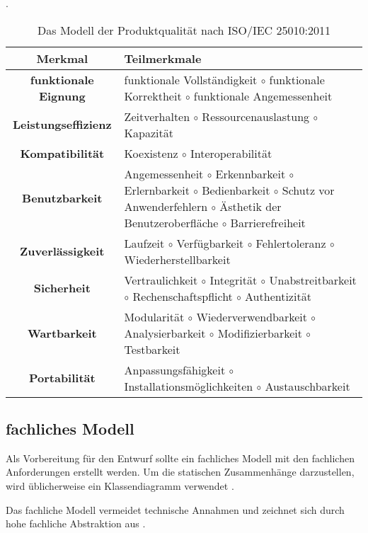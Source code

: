 \begin{table}[H]
    \centering
    \caption{Das Modell der Produktqualität nach ISO/IEC 25010:2011 \autocite[vgl.][S. 10]{ISO25010}}. 
    \label{table:SQuaRE}
    \begin{tabularx}{\columnwidth}{c|X}
    \textbf{Merkmal} & \textbf{Teilmerkmale} \\
    \hline
    \hline
    \textbf{funktionale Eignung} & 
        funktionale Vollständigkeit {$\circ$} funktionale Korrektheit {$\circ$} funktionale Angemessenheit 
    \\
    \hline
    \textbf{Leistungseffizienz}  & 
        Zeitverhalten {$\circ$} Ressourcenauslastung {$\circ$} Kapazität
    \\
    \hline
    \textbf{Kompatibilität}  & 
        Koexistenz {$\circ$} Interoperabilität
    \\
    \hline
    \textbf{Benutzbarkeit}  & 
        Angemessenheit {$\circ$} Erkennbarkeit {$\circ$} Erlernbarkeit {$\circ$} Bedienbarkeit {$\circ$} Schutz vor Anwenderfehlern {$\circ$} Ästhetik der Benutzeroberfläche {$\circ$} Barrierefreiheit
    \\
    \hline
    \textbf{Zuverlässigkeit}  & 
        Laufzeit {$\circ$} Verfügbarkeit {$\circ$} Fehlertoleranz {$\circ$} Wiederherstellbarkeit
    \\
    \hline
    \textbf{Sicherheit}  & 
        Vertraulichkeit {$\circ$} Integrität {$\circ$} Unabstreitbarkeit {$\circ$} Rechenschaftspflicht {$\circ$} Authentizität 
    \\
    \hline
    \textbf{Wartbarkeit}  & 
        Modularität {$\circ$} Wiederverwendbarkeit {$\circ$} Analysierbarkeit {$\circ$} Modifizierbarkeit {$\circ$} Testbarkeit
    \\
    \hline
    \textbf{Portabilität} & 
        Anpassungsfähigkeit {$\circ$} Installationsmöglichkeiten {$\circ$} \newline Austauschbarkeit
\end{tabularx}
\end{table}

\subsection{fachliches Modell}
Als Vorbereitung für den Entwurf sollte ein fachliches Modell mit den fachlichen Anforderungen erstellt werden. Um die statischen Zusammenhänge darzustellen, wird üblicherweise ein Klassendiagramm verwendet \autocite[vgl.][S. 63]{Posch2007}. 

Das fachliche Modell vermeidet technische Annahmen und zeichnet sich durch hohe fachliche Abstraktion aus \autocite[vgl.][S. 52]{Vogel2009}. 

